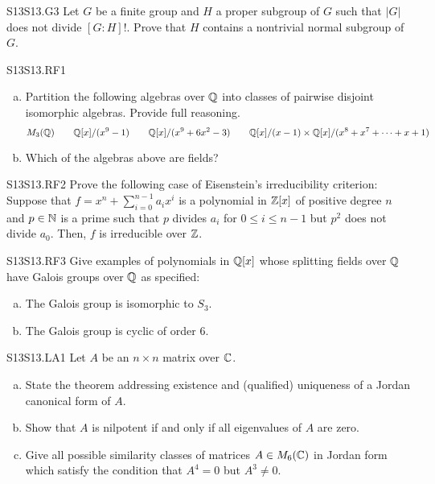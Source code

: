 \documentclass[../AlgebraQualSolutions.tex]{subfiles}
\begin{document}
\begin{prob}{S13}{S13.G3}
	Let $G$ be a finite group and $H$ a proper subgroup of $G$ such that $|G|$ does not divide $[G:H]!$. Prove that $H$ contains a nontrivial normal subgroup of $G$.
\end{prob}

\begin{prob}{S13}{S13.RF1}

	\begin{enumerate}[(a)]
		\item Partition the following algebras over $\mathbb{Q}$ into classes of pairwise disjoint isomorphic algebras. Provide full reasoning.
			\[M_3(\mathbb{Q}) \quad  \quad \mathbb{Q}[x]/(x^9 - 1) \quad \quad \mathbb{Q}[x]/(x^9 + 6x^2 - 3) \quad  \quad \mathbb{Q}[x]/(x-1) \times \mathbb{Q}[x]/(x^8 + x^7 + \cdots + x + 1)\]
		\item Which of the algebras above are fields?
	\end{enumerate}
\end{prob}

\begin{prob}{S13}{S13.RF2}
	Prove the following case of Eisenstein's irreducibility criterion: Suppose that $f = x^n + \sum_{i=0}^{n-1} a_i x^i$ is a polynomial in $\mathbb{Z}[x]$ of positive degree $n$ and $p \in \mathbb{N}$ is a prime such that $p$ divides $a_i$ for $0 \leq i \leq n - 1$ but $p^2$ does not divide $a_0$. Then, $f$ is irreducible over $\mathbb{Z}$.
\end{prob}

\begin{prob}{S13}{S13.RF3}
Give examples of polynomials in $\mathbb{Q}[x]$ whose splitting fields over $\mathbb{Q}$ have Galois groups over $\mathbb{Q}$ as specified:
	\begin{enumerate}[(a)]
		\item The Galois group is isomorphic to $S_3$.
		\item The Galois group is cyclic of order 6.
	\end{enumerate}
\end{prob}

\begin{prob}{S13}{S13.LA1}
Let $A$ be an $n \times n$ matrix over $\mathbb{C}$.
	\begin{enumerate}[(a)]
		\item State the theorem addressing existence and (qualified) uniqueness of a Jordan canonical form of $A$.
		\item Show that $A$ is nilpotent if and only if all eigenvalues of $A$ are zero.
		\item Give all possible similarity classes of matrices $A \in M_6(\mathbb{C})$ in Jordan form which satisfy the condition that  $A^4 = 0$ but $A^3 \neq 0$.
	\end{enumerate}
\end{prob}
\end{document}
